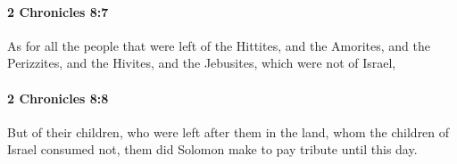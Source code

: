 		\paragraph{2 Chronicles 8:7} %
			\label{2CHRONICLES-8-7}

			As for all the people that were left of the Hittites, and the Amorites, and the Perizzites, and the Hivites, and the Jebusites, which were not of Israel,


		\paragraph{2 Chronicles 8:8} %
			\label{2CHRONICLES-8-8}

			But of their children, who were left after them in the land, whom the children of Israel consumed not, them did Solomon make to pay tribute until this day.


